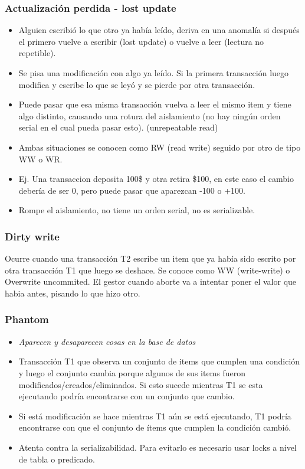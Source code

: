 \subsubsection*{Actualización perdida - lost update}
\begin{itemize}
\item Alguien escribió lo que otro ya había leído, deriva en una anomalía si después el primero vuelve a escribir (lost update) o vuelve a leer (lectura no repetible).
\item Se pisa una modificación con algo ya leído. Si la primera transacción luego modifica y escribe lo que se leyó y se pierde por otra transacción.
\item Puede pasar que esa misma transacción vuelva a leer el mismo item y tiene algo distinto, causando una rotura del aislamiento (no hay ningún orden serial en el cual pueda pasar esto). (unrepeatable read)
\item Ambas situaciones se conocen como RW (read write) seguido por otro de tipo WW o WR.
\item Ej. Una transaccion deposita 100\$ y otra retira \$100, en este caso el cambio debería de ser 0, pero puede pasar que aparezcan -100 o +100.
\item Rompe el aislamiento, no tiene un orden serial, no es serializable.
\end{itemize}


\subsubsection*{Dirty write}
Ocurre cuando una transacción T2 escribe un item que ya había sido escrito por otra transacción T1 que luego se deshace. Se conoce como WW (write-write) o Overwrite uncommited. El gestor cuando aborte va a intentar poner el valor que habia antes, pisando lo que hizo otro.


\subsubsection*{Phantom}
\begin{itemize}
\item \textit{Aparecen y desaparecen cosas en la base de datos}
\item Transacción T1 que observa un conjunto de items que cumplen una condición y luego el conjunto cambia porque algunos de sus items fueron modificados/creados/eliminados. Si esto sucede mientras T1 se esta ejecutando podría encontrarse con un conjunto que cambio.
\item Si está modificación se hace mientras T1 aún se está ejecutando, T1 podría encontrarse con que el conjunto de ítems que cumplen la condición cambió.
\item Atenta contra la serializabilidad. Para evitarlo es necesario usar locks a nivel de tabla o predicado.
\end{itemize}


